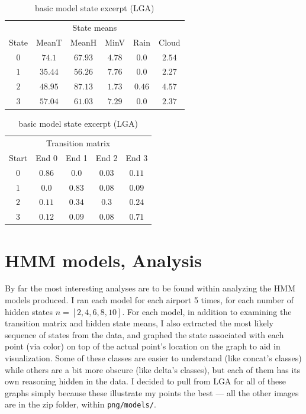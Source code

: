 \documentclass[a4paper]{article}
\begin{document}
\begin{table}[th]
  \caption{basic model state excerpt (LGA)}
  \label{tab:basic}
  \centering
  \begin{tabular}{c c c c c c}
    \toprule 
    \multicolumn{6}{c}{State means}\\
    State & MeanT & MeanH & MinV & Rain & Cloud \\
    \midrule
    $0$ & $74.1$   &  $67.93$  &  $4.78$  &  $0.0$    &   $2.54$ \\
    $1$ & $35.44$  &  $56.26$  &  $7.76$  &  $0.0$    &   $2.27$ \\
    $2$ & $48.95$  &  $87.13$  &  $1.73$  &  $0.46$   &   $4.57$ \\
    $3$ & $57.04$  &  $61.03$  &  $7.29$  &  $0.0$    &   $2.37$ \\
    \bottomrule
  \end{tabular}

  \begin{tabular}{c c c c c}
    \toprule
    \multicolumn{5}{c}{Transition matrix}\\
    Start & End 0 & End 1 & End 2 & End 3 \\
    \midrule  
    $0$ & $0.86$  &  $0.0 $  &  $0.03$  &  $0.11$ \\
    $1$ & $0.0 $  &  $0.83$  &  $0.08$  &  $0.09$ \\
    $2$ & $0.11$  &  $0.34$  &  $0.3 $  &  $0.24$ \\
    $3$ & $0.12$  &  $0.09$  &  $0.08$  &  $0.71$ \\
    \bottomrule
  \end{tabular}
\end{table} 




\section{HMM models, Analysis}

By far the most interesting analyses are to be found within analyzing the HMM models produced. I ran each model for each airport 5 times, for each number of hidden states $n=[2,4,6,8,10]$. For each model, in addition to examining the transition matrix and hidden state means, I also extracted the most likely sequence of states from the data, and graphed the state associated with each point (via color) on top of the actual point's location on the graph to aid in visualization. Some of these classes are easier to understand (like concat's classes) while others are a bit more obscure (like delta's classes), but each of them has its own reasoning hidden in the data. I decided to pull from LGA for all of these graphs simply because these illustrate my points the best --- all the other images are in the zip folder, within \texttt{png/models/}.
\end{document}
